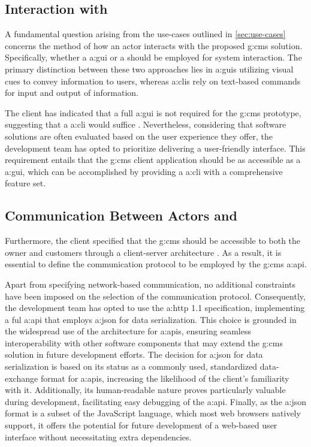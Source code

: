\subsection{Interaction with }\label{sec:req-interaction}
A fundamental question arising from the use-cases outlined in \cref{sec:use-cases} concerns the method of how an actor interacts with the proposed \gls{g:cms} solution. Specifically, whether a \gls{a:gui} or a  should be employed for system interaction. The primary distinction between these two approaches lies in \glspl{a:gui} utilizing visual cues to convey information to users, whereas \glspl{a:cli} rely on text-based commands for input and output of information.

The client has indicated that a full \gls{a:gui} is not required for the \gls{g:cms} prototype, suggesting that a \gls{a:cli} would suffice \cite[2]{IIS2-ass}. Nevertheless, considering that software solutions are often evaluated based on the user experience they offer, the development team has opted to prioritize delivering a user-friendly interface. This requirement entails that the \gls{g:cms} client application should be as accessible as a \gls{a:gui}, which can be accomplished by providing a \gls{a:cli} with a comprehensive feature set.

\subsection{Communication Between Actors and }\label{sec:req-protocol}

Furthermore, the client specified that the \gls{g:cms} should be accessible to both the owner and customers through a client-server architecture \cite{IIS2-ass}. As a result, it is essential to define the communication protocol to be employed by the \gls{g:cms} \gls{a:api}.

Apart from specifying network-based communication, no additional constraints have been imposed on the selection of the communication protocol. Consequently, the development team has opted to use the \gls{a:http} 1.1 specification, implementing a ful \gls{a:api} that employs \gls{a:json} for data serialization. This choice is grounded in the widespread use of the  architecture for \glspl{a:api}, ensuring seamless interoperability with other software components that may extend the \gls{g:cms} solution in future development efforts. The decision for \gls{a:json} for data serialization is based on its status as a commonly used, standardized data-exchange format for \glspl{a:api}, increasing the likelihood of the client's familiarity with it. Additionally, its human-readable nature proves particularly valuable during development, facilitating easy debugging of the \gls{a:api}. Finally, as the \gls{a:json} format is a subset of the JavaScript language, which most web browsers natively support, it offers the potential for future development of a web-based user interface without necessitating extra dependencies.

